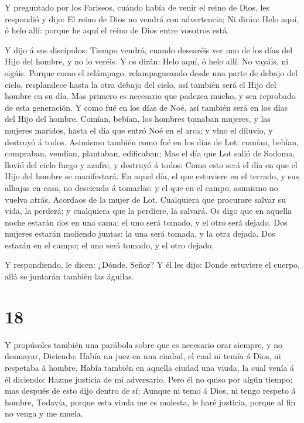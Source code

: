  Y preguntado por los Fariseos, cuándo había de venir el
reino de Dios, les respondió y dijo: El reino de Dios no vendrá con
advertencia;  Ni dirán: Helo aquí, ó helo allí: porque he
aquí el reino de Dios entre vosotros está.

 Y dijo á sus discípulos: Tiempo vendrá, cuando desearéis
ver uno de los días del Hijo del hombre, y no lo veréis.  Y
os dirán: Helo aquí, ó helo allí. No vayáis, ni sigáis. 
Porque como el relámpago, relampagueando desde una parte de debajo del
cielo, resplandece hasta la otra debajo del cielo, así también será el
Hijo del hombre en su día.  Mas primero es necesario que
padezca mucho, y sea reprobado de esta generación.  Y como
fué en los días de Noé, así también será en los días del Hijo del
hombre.  Comían, bebían, los hombres tomaban mujeres, y las
mujeres maridos, hasta el día que entró Noé en el arca; y vino el
diluvio, y destruyó á todos.  Asimismo también como fué en
los días de Lot; comían, bebían, compraban, vendían, plantaban,
edificaban;  Mas el día que Lot salió de Sodoma, llovió del
cielo fuego y azufre, y destruyó á todos:  Como esto será
el día en que el Hijo del hombre se manifestará.  En aquel
día, el que estuviere en el terrado, y sus alhajas en casa, no descienda
á tomarlas: y el que en el campo, asimismo no vuelva atrás.
 Acordaos de la mujer de Lot.  Cualquiera que
procurare salvar su vida, la perderá; y cualquiera que la perdiere, la
salvará.  Os digo que en aquella noche estarán dos en una
cama; el uno será tomado, y el otro será dejado.  Dos
mujeres estarán moliendo juntas: la una será tomada, y la otra dejada.
 Dos estarán en el campo; el uno será tomado, y el otro
dejado.

 Y respondiendo, le dicen: ¿Dónde, Señor? Y él les dijo:
Donde estuviere el cuerpo, allá se juntarán también las águilas.

\hypertarget{section-17}{%
\section{18}\label{section-17}}

 Y propúsoles también una parábola sobre que es necesario
orar siempre, y no desmayar,  Diciendo: Había un juez en una
ciudad, el cual ni temía á Dios, ni respetaba á hombre. 
Había también en aquella ciudad una viuda, la cual venía á él diciendo:
Hazme justicia de mi adversario.  Pero él no quiso por algún
tiempo; mas después de esto dijo dentro de sí: Aunque ni temo á Dios, ni
tengo respeto á hombre,  Todavía, porque esta viuda me es
molesta, le haré justicia, porque al fin no venga y me muela.

